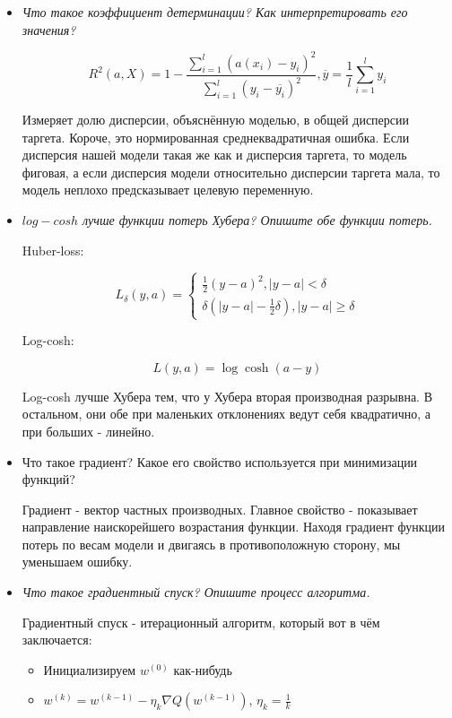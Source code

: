 \documentclass[12pt]{article}
\begin{document}
\begin{itemize}
\item \textit{Что такое коэффициент детерминации? Как интерпретировать его значения?}

\[ R^2(a, X) = 1 - \frac{\sum_{i=1}^l (a(x_i) - y_i)^2}{\sum_{i=1}^l (y_i - \overline{y_i})^2}, \overline{y} = \frac{1}{l} \sum_{i=1}^l y_i \]

Измеряет долю дисперсии, объяснённую моделью, в общей дисперсии таргета. Короче, это нормированная среднеквадратичная ошибка. Если дисперсия нашей модели такая же как и дисперсия таргета, то модель фиговая, а если дисперсия модели относительно дисперсии таргета мала, то модель неплохо предсказывает целевую переменную.

\item \textit{$log-cosh$ лучше функции потерь Хубера? Опишите обе функции потерь.}

Huber-loss:

\[ L_\delta(y, a) = \begin{cases}
\frac{1}{2} (y-a)^2, |y-a| < \delta \\
\delta \left( |y-a| - \frac{1}{2} \delta \right), |y-a| \geq \delta
\end{cases} \]

Log-cosh:

\[ L(y, a) = \log \cosh (a-y) \]

Log-cosh лучше Хубера тем, что у Хубера вторая производная разрывна. В остальном, они обе при маленьких отклонениях ведут себя квадратично, а при больших - линейно.

\item Что такое градиент? Какое его свойство используется при минимизации функций?

Градиент - вектор частных производных. Главное свойство - показывает направление наискорейшего возрастания функции. Находя градиент функции потерь по весам модели и двигаясь в противоположную сторону, мы уменьшаем ошибку.

\item \textit{Что такое градиентный спуск? Опишите процесс алгоритма.}

Градиентный спуск - итерационный алгоритм, который вот в чём заключается:

\begin{itemize}

\item Инициализируем $w^{(0)}$ как-нибудь

\item $w^{(k)} = w^{(k-1)} - \eta_k \nabla Q(w^{(k-1)})$, $\eta_k = \frac{1}{k}$


\end{itemize}
\end{itemize}
\end{document}
